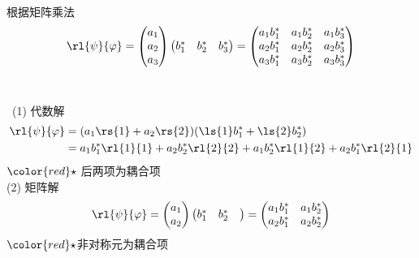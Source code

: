 \begin{frame}{}
    ~~\\ 
        \解 根据矩阵乘法
        ~ \[\rl{\psi}{\varphi} = \begin{pmatrix}
            a_1  \\
            a_2  \\
            a_3 
        \end{pmatrix}
            \begin{pmatrix}
            b_1 ^* &
            b_2 ^* &
            b_3 ^*
        \end{pmatrix}
        =  \begin{pmatrix}
            a_1b_1 ^* & a_1b_2 ^* & a_1b_3 ^* \\
            a_2b_1 ^* & a_2b_2 ^* & a_2b_3 ^* \\
            a_3b_1 ^* & a_3b_2 ^* & a_3b_3 ^* 
        \end{pmatrix}
        \]
\end{frame}

\begin{frame} 
\frametitle{}
~~\\ 
 \解 ~(1) 代数解 
   \[ \begin{aligned}
    \rl{\psi}{\varphi} &= (a_1 \rs{1} + a_2 \rs{2}) (\ls{1}b_1 ^*  + \ls{2} b_2 ^* )\\
      &= a_1 b_1 ^* \rl{1}{1} + a_2 b_2 ^* \rl{2}{2} + a_1 b_2 ^* \rl{1}{2} + a_2 b_1 ^* \rl{2}{1} \\
   \end{aligned}\]   
   ${\color{red}\star}~$后两项为耦合项\\ 
(2) 矩阵解
~ \[\rl{\psi}{\varphi} = \begin{pmatrix}
    a_1  \\
    a_2  
\end{pmatrix}
    \begin{pmatrix}
    b_1 ^* &
    b_2 ^* &
\end{pmatrix}
=  \begin{pmatrix}
    a_1b_1 ^* & a_1b_2 ^*  \\
    a_2b_1 ^* & a_2b_2 ^*  
\end{pmatrix}
\]
${\color{red}\star}$非对称元为耦合项
\end{frame}

